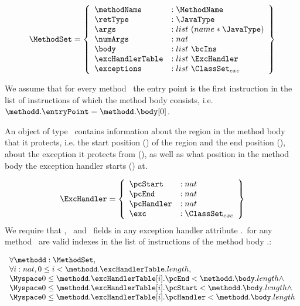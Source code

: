  $$ \begin{array}{l} %
                     \MethodSet  = \left\{\begin{array}{ll}  \methodName & :\MethodName\\
						          \retType & :\JavaType\\
							  \args &  : list \ (name * \JavaType) \\
							  \numArgs & : nat \\
							  \body &  : list \ \bcIns \\
							  \excHandlerTable & : list \ \ExcHandler \\
							  \exceptions & : list \ \ClassSet_{exc}
                                     \end{array}  \right\}
     \end{array} $$
  
 We assume that for every method \methodd \ the entry point is the first instruction in the list of instructions 
 of which the method body consists, i.e. $ \methodd.\entryPoint =\methodd.\body[0]$.

 An object of type \ExcHandler \ contains information about the region in the method body that it protects, i.e. the start
 position (\pcStart) of the region and the end position (\pcEnd), about the exception it protects from (\exc),
 as well as what position in the method body the exception handler starts (\pcHandler) at.


 $$ \begin{array}{l}  
                 \ExcHandler = \left\{\begin{array}{ll} \pcStart & : nat \\
						          \pcEnd & : nat \\
							  \pcHandler &  : nat \\
							  \exc & : \ClassSet_{exc} 
                                        \end{array}  \right\}
     \end{array} $$
   We require that \pcStart, \pcEnd \ and \pcHandler \ fields in any exception handler attribute \methodd.\excHandlerTable \ for any method \methodd \
   are valid indexes in the list  of instructions of the method body  \methodd.\body :
 
$$ \begin{array}{l}  \forall \methodd: \MethodSet,  \\
                      \forall i:nat, 0 \le i <  \methodd.\excHandlerTable.length,  \\
                            \Myspace 0 \le \methodd.\excHandlerTable[i].\pcEnd <  \methodd.\body.length \wedge  \\
			    \Myspace 0 \le \methodd.\excHandlerTable[i].\pcStart <  \methodd.\body.length  \wedge \\
			    \Myspace 0 \le \methodd.\excHandlerTable[i].\pcHandler <  \methodd.\body.length  
    \end{array}
 $$


 
  
